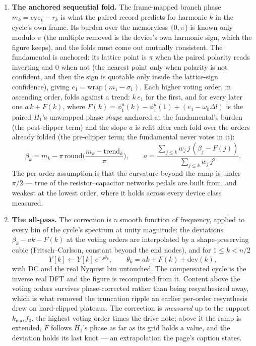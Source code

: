 \documentclass[11pt,a4paper]{article}
\begin{document}
\begin{enumerate}
\item \textbf{The anchored sequential fold.} The frame-mapped branch phase
$m_k = \mathrm{cyc}_k - r_k$ is what the paired record predicts for harmonic
$k$ in the cycle's own frame. Its burden over the memoryless
 $\{0, \pi\}$ is known only modulo $\pi$ (the multiple
removed is the device's own harmonic sign, which the figure keeps), and the
folds must come out mutually consistent. The fundamental is anchored: its
lattice point is $\pi$ when the paired polarity reads inverting and $0$
when not (the nearest point only when polarity is not confident, and then
the sign is quotable only inside the lattice-sign confidence), giving
$e_1 = \mathrm{wrap}(m_1 - \sigma_1)$. Each higher voting order, in
ascending order, folds against a trend: $k\,e_1$ for the first, and for
every later one $a\,k + F(k)$, where $F(k) = \phi^{u}_1(k) - \phi^{u}_1(1) +
(e_1 - \omega_0\Delta l)$ is the paired $H_1$'s unwrapped phase \emph{shape}
anchored at the fundamental's burden (the post-clipper term) and the slope
$a$ is refit after each fold over the orders already folded (the pre-clipper
term; the fundamental never votes in it):
\begin{equation}
  \beta_k = m_k - \pi\,\mathrm{round}\!\Big(\frac{m_k - \mathrm{trend}_k}{\pi}\Big),\qquad
  a = \frac{\sum_{j \le k} w_j\, j\,(\beta_j - F(j))}{\sum_{j \le k} w_j\, j^2} .
  \label{eq:fold}
\end{equation}
The per-order assumption is that the curvature beyond the ramp is under
$\pi/2$ --- true of the resistor--capacitor networks pedals are built from,
and weakest at the lowest order, where it holds across every device class
measured.

\item \textbf{The all-pass.} The correction is a smooth function of
frequency, applied to every bin of the cycle's spectrum at unity
magnitude: the deviations $\beta_k - a k - F(k)$ at the voting orders are
interpolated by a shape-preserving cubic (Fritsch--Carlson, constant beyond
the end nodes), and for $1 \le k < n/2$
\begin{equation}
  Y[k] \leftarrow Y[k]\,e^{-j\theta_k},\qquad
  \theta_k = a k + F(k) + \mathrm{dev}(k),
  \label{eq:allpass}
\end{equation}
with DC and the real Nyquist bin untouched. The compensated cycle is the
inverse real DFT and the figure is recomputed from it. Content above the
voting orders survives phase-corrected rather than being resynthesized
away, which is what removed the truncation ripple an earlier per-order
resynthesis drew on hard-clipped plateaus. The correction is
\emph{measured} up to the support $k_{\max} f_0$, the highest voting order
times the drive note; above it the ramp is extended, $F$ follows $H_1$'s
phase as far as its grid holds a value, and the deviation holds its last
knot --- an extrapolation the page's caption states.


\end{enumerate}
\end{document}
